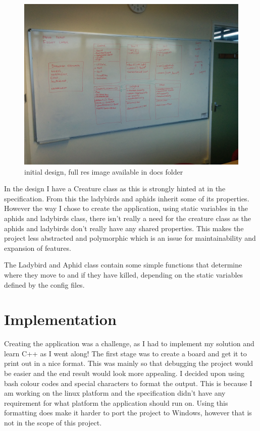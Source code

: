 \documentclass[10pt]{article}
\begin{document}
  \begin{figure}[ht!]
  \centering
  \includegraphics[scale=0.10]{design.jpg}
  \caption{initial design, full res image available in docs folder \label{overflow}}
  \end{figure}

  In the design I have a Creature class as this is strongly hinted at in the specification. From this the ladybirds and aphids inherit some of its properties. However the way I chose to create the application, using static variables in the aphids and ladybirds class, there isn't really a need for the creature class as the aphids and ladybirds don't really have any shared properties. This makes the project less abstracted and polymorphic which is an issue for maintainability and expansion of features. 

  The Ladybird and Aphid class contain some simple functions that determine where they move to and if they have killed, depending on the static variables defined by the config files.

  \section{Implementation}
Creating the application was a challenge, as I had to implement my solution and learn C++ as I went along! The first stage was to create a board and get it to print out in a nice format. This was mainly so that debugging the project would be easier and the end result would look more appealing. I decided upon using bash colour codes and special characters to format the output. This is because I am working on the linux platform and the specification didn't have any requirement for what platform the application should run on. Using this formatting does make it harder to port the project to Windows, however that is not in the scope of this project.
\end{document}
